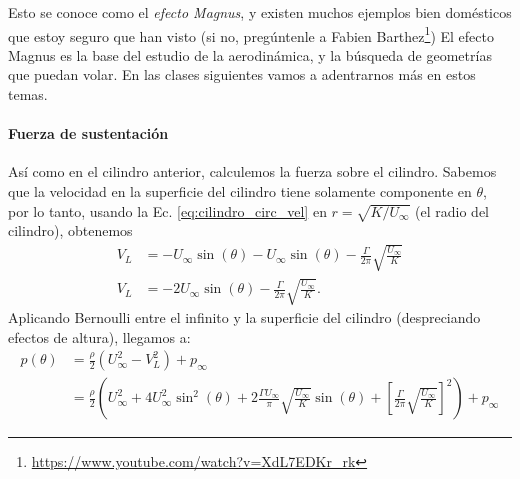 Esto se conoce como el \emph{efecto Magnus}, y existen muchos ejemplos bien domésticos que estoy seguro que han visto (si no, pregúntenle a Fabien Barthez\footnote{\url{https://www.youtube.com/watch?v=XdL7EDKr_rk}})
El efecto Magnus es la base del estudio de la aerodinámica, y la búsqueda de geometrías que puedan volar.
En las clases siguientes vamos a adentrarnos más en estos temas.

\paragraph*{Fuerza de sustentación}
Así como en el cilindro anterior, calculemos la fuerza sobre el cilindro.
Sabemos que la velocidad en la superficie del cilindro tiene solamente componente en $\theta$, por lo tanto, usando la Ec. \eqref{eq:cilindro_circ_vel} en $r=\sqrt{K/U_\infty}$ (el radio del cilindro), obtenemos
%
\begin{align}\label{eq:cilindro_vel_superficie}
V_L &= -U_\infty\sin(\theta) - U_\infty\sin(\theta) - \frac{\Gamma}{2\pi}\sqrt{\frac{U_\infty}{K}}\nonumber\\
V_L &= -2U_\infty\sin(\theta) - \frac{\Gamma}{2\pi}\sqrt{\frac{U_\infty}{K}}.
\end{align}
%
Aplicando Bernoulli entre el infinito y la superficie del cilindro (despreciando efectos de altura), llegamos a:
%
\begin{align}\label{eq:cilindro_circ_p}
p(\theta) &= \frac{\rho}{2}\left(U_\infty^2-V_L^2\right) + p_\infty \nonumber\\
&= \frac{\rho}{2}\left(U_\infty^2+4U_\infty^2\sin^2(\theta) + 2\frac{\Gamma U_\infty}{\pi}\sqrt{\frac{U_\infty}{K}}\sin(\theta) + \left[\frac{\Gamma}{2\pi}\sqrt{\frac{U_\infty}{K}}\right]^2\right) + p_\infty
\end{align}

